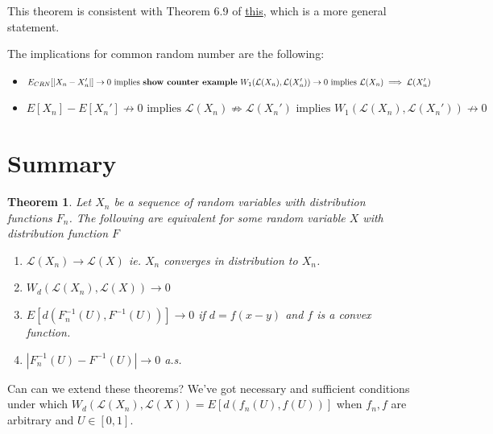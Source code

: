 \documentclass{article}
\theoremstyle{plain}%
\newtheorem{theorem}{Theorem}[section]
\theoremstyle{definition}
\theoremstyle{remark}
\begin{document}
	This theorem is consistent with Theorem 6.9 of \href{https://cedricvillani.org/sites/dev/files/old_images/2012/08/preprint-1.pdf}{this}, which is a more general statement.
	
	
	The implications for common random number are the following:
	
	\begin{itemize}
		\item $E_{CRN}[|X_n - X_n'|]\to 0 \text{ implies \textbf{show counter example} } W_{1}(\mathcal{L}(X_n),\mathcal{L}(X_n'))\to 0 \text{ implies } \mathcal{L}(X_n)\implies\mathcal{L}(X_n')$
		\item $E[X_n] -E[X_n'] \not \rightarrow 0 \text{ implies }
		\mathcal{L}(X_n)\not \Rightarrow \mathcal{L}(X_n') \text{ implies } W_{1}(\mathcal{L}(X_n),\mathcal{L}(X_n'))\not \rightarrow 0 $
	\end{itemize}
	
	\section{Summary}
	\begin{theorem}
		Let $X_n$ be a sequence of random variables with distribution functions $F_n$. The following are equivalent for some random variable $X$ with distribution function $F$
		\begin{enumerate}
			\item $\mathcal{L}(X_n)\to \mathcal{L}(X)$ ie. $X_n$ converges in distribution to $X_n$.
			\item $W_{d}(\mathcal{L}(X_n), \mathcal{L}(X))\to 0$ %
			\item $E[d(F^{-1}_n(U), F^{-1}(U))]\to 0$ if $d=f(x-y)$ and $f$ is a convex function.
			\item $|F_n^{-1}(U)-F^{-1}(U)|\to 0$ a.s.
		\end{enumerate}
	\end{theorem}
	
	Can can we extend these theorems? 
	We've got necessary and sufficient conditions under which $W_{d}(\mathcal{L}(X_n), \mathcal{L}(X))=E[d(f_n(U), f(U))]$ when $f_n,f$ are arbitrary and $U\in [0,1]$. 
	
\end{document}
